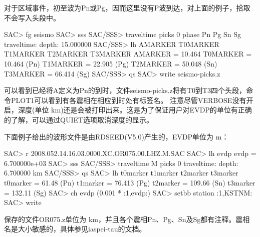对于区域事件，初至波为Pn或Pg，因而这里没有P波到达，对上面的例子，拾取不会写入头段中。
\begin{SACCode}
SAC> fg seismo
SAC> sss
SAC/SSS> traveltime picks 0 phase Pn Pg Sn Sg
traveltime: depth: 15.000000
SAC/SSS> lh AMARKER T0MARKER T1MARKER T2MARKER T3MARKER
AMARKER = 10.464
T0MARKER = 10.464           (Pn)
T1MARKER = 22.905           (Pg)
T2MARKER = 50.048           (Sn)
T3MARKER = 66.414           (Sg)
SAC/SSS> qs
SAC> write seismo-picks.z
\end{SACCode}
可以看到已经将A定义为Pn的到时，文件seismo-picks.z将有T0到T3四个头段，命令PLOT1可以看到有各震相在相应到时处有标签名。
注意尽管VERBOSE没有开启，深度(单位 \si{\km})还是会被打印出来。这是为了保证用户对EVDP的单位有正确的了解，可以通过QUIET选项取消深度的显示。

下面例子给出的波形文件是由RDSEED(V5.0)产生的，EVDP单位为 \si{\m}：
\begin{SACCode}
SAC> r 2008.052.14.16.03.0000.XC.OR075.00.LHZ.M.SAC
SAC> lh evdp
evdp = 6.700000e+03
SAC> sss
SAC/SSS> traveltime M picks 0
traveltime: depth: 6.700000 km
SAC/SSS> qs
SAC> lh t0marker t1marker t2marker t3marker
t0marker = 61.48            (Pn)
t1marker = 76.413           (Pg)
t2marker = 109.66           (Sn)
t3marker = 132.11           (Sg)
SAC> ch evdp (0.001 * :1,evdp:)
SAC> setbb station :1,KSTNM:
SAC> write %
\end{SACCode}
保存的文件OR075.z单位为 \si{\km}，并且各个震相Pn、Pg、Sn及Sg都有注释。震相名是大小敏感的，具体参见iaspei-tau的文档。


